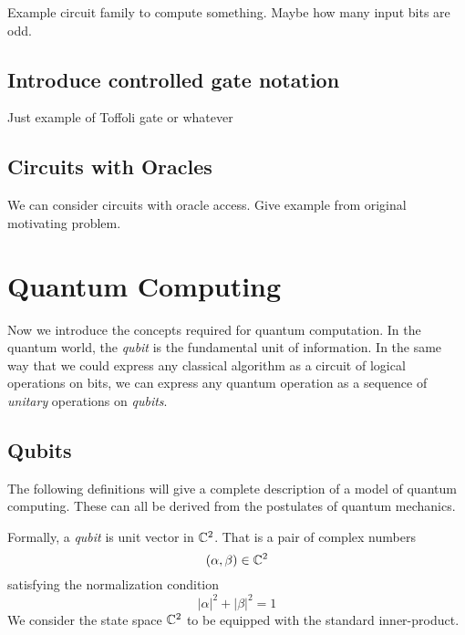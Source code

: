         \begin{example}
            Example circuit family to compute something. Maybe how many input bits are odd.  
            \begin{figure}[ht]
                \centering
                    \placeholderfig
                \caption{}
            \end{figure}
        \end{example}
        
        \subsection{Introduce controlled gate notation}
        
        Just example of Toffoli gate or whatever

        \subsection{Circuits with Oracles}

        We can consider circuits with oracle access.  Give example from original motivating problem.



\section{Quantum Computing}
        Now we introduce the concepts required for quantum computation. In the quantum world, the \emph{qubit} is 
        the fundamental unit of information. In the same way that we could express any classical algorithm as a 
        circuit of logical operations on bits, we can express any quantum operation as a sequence of \emph{unitary} 
        operations on \emph{qubits}.
       
   \subsection{Qubits}

        The following definitions will give a complete description of a model of quantum computing. These can all 
        be derived from the postulates of quantum mechanics.
        
      \begin{definition}
            Formally, a \emph{qubit} is unit vector in $\mathbb{C}^2$. That is a pair of complex numbers
            \[
                (\alpha, \beta) \in \mathbb{C}^2
            \]
            satisfying the normalization condition %
            \[
                |\alpha|^2 + |\beta|^2 = 1
            \]
            We consider the state space $\mathbb{C}^2$ to be equipped with the standard inner-product.
        \end{definition}
        
